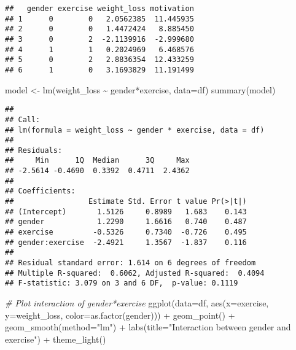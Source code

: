 \documentclass[
]{article}
\newenvironment{Shaded}{\begin{snugshade}}{\end{snugshade}}
\newcommand{\AttributeTok}[1]{\textcolor[rgb]{0.77,0.63,0.00}{#1}}
\newcommand{\CommentTok}[1]{\textcolor[rgb]{0.56,0.35,0.01}{\textit{#1}}}
\newcommand{\FunctionTok}[1]{\textcolor[rgb]{0.00,0.00,0.00}{#1}}
\newcommand{\NormalTok}[1]{#1}
\newcommand{\OtherTok}[1]{\textcolor[rgb]{0.56,0.35,0.01}{#1}}
\newcommand{\SpecialCharTok}[1]{\textcolor[rgb]{0.00,0.00,0.00}{#1}}
\newcommand{\StringTok}[1]{\textcolor[rgb]{0.31,0.60,0.02}{#1}}
\begin{document}
\begin{verbatim}
##   gender exercise weight_loss motivation
## 1      0        0   2.0562385  11.445935
## 2      0        0   1.4472424   8.885450
## 3      0        2  -2.1139916  -2.999680
## 4      1        1   0.2024969   6.468576
## 5      0        2   2.8836354  12.433259
## 6      1        0   3.1693829  11.191499
\end{verbatim}

\begin{Shaded}
\begin{Highlighting}[]
\NormalTok{model }\OtherTok{\textless{}{-}} \FunctionTok{lm}\NormalTok{(weight\_loss }\SpecialCharTok{\textasciitilde{}}\NormalTok{ gender}\SpecialCharTok{*}\NormalTok{exercise, }\AttributeTok{data=}\NormalTok{df)}
\FunctionTok{summary}\NormalTok{(model)}
\end{Highlighting}
\end{Shaded}

\begin{verbatim}
## 
## Call:
## lm(formula = weight_loss ~ gender * exercise, data = df)
## 
## Residuals:
##     Min      1Q  Median      3Q     Max 
## -2.5614 -0.4690  0.3392  0.4711  2.4362 
## 
## Coefficients:
##                 Estimate Std. Error t value Pr(>|t|)
## (Intercept)       1.5126     0.8989   1.683    0.143
## gender            1.2290     1.6616   0.740    0.487
## exercise         -0.5326     0.7340  -0.726    0.495
## gender:exercise  -2.4921     1.3567  -1.837    0.116
## 
## Residual standard error: 1.614 on 6 degrees of freedom
## Multiple R-squared:  0.6062, Adjusted R-squared:  0.4094 
## F-statistic: 3.079 on 3 and 6 DF,  p-value: 0.1119
\end{verbatim}

\begin{Shaded}
\begin{Highlighting}[]
\CommentTok{\# Plot interaction of gender*exercise}
\FunctionTok{ggplot}\NormalTok{(}\AttributeTok{data=}\NormalTok{df, }\FunctionTok{aes}\NormalTok{(}\AttributeTok{x=}\NormalTok{exercise, }\AttributeTok{y=}\NormalTok{weight\_loss, }\AttributeTok{color=}\FunctionTok{as.factor}\NormalTok{(gender))) }\SpecialCharTok{+}
  \FunctionTok{geom\_point}\NormalTok{() }\SpecialCharTok{+}
  \FunctionTok{geom\_smooth}\NormalTok{(}\AttributeTok{method=}\StringTok{"lm"}\NormalTok{) }\SpecialCharTok{+}
  \FunctionTok{labs}\NormalTok{(}\AttributeTok{title=}\StringTok{"Interaction between gender and exercise"}\NormalTok{) }\SpecialCharTok{+}
  \FunctionTok{theme\_light}\NormalTok{()}
\end{Highlighting}
\end{Shaded}
\end{document}
